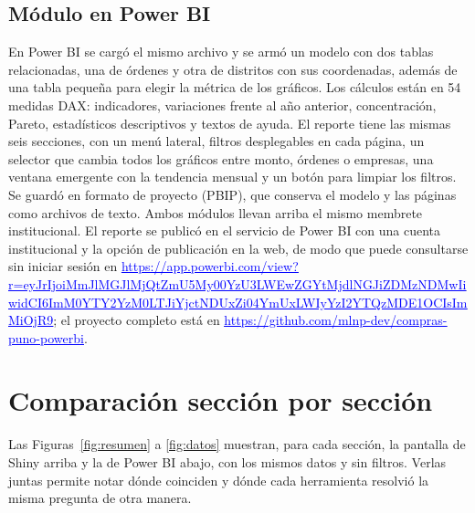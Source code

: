 \documentclass[12pt,a4paper]{article}
\newcommand{\enlace}[2]{\href{#1}{\textcolor{blue}{#2}}}
\begin{document}
\subsection{Módulo en Power BI}
En Power BI se cargó el mismo archivo y se armó un modelo con dos tablas relacionadas, una de órdenes y
otra de distritos con sus coordenadas, además de una tabla pequeña para elegir la métrica de los gráficos.
Los cálculos están en 54 medidas DAX: indicadores, variaciones frente al año anterior, concentración,
Pareto, estadísticos descriptivos y textos de ayuda. El reporte tiene las mismas seis secciones, con un
menú lateral, filtros desplegables en cada página, un selector que cambia todos los gráficos entre monto,
órdenes o empresas, una ventana emergente con la tendencia mensual y un botón para limpiar los filtros. Se
guardó en formato de proyecto (PBIP), que conserva el modelo y las páginas como archivos de texto. Ambos
módulos llevan arriba el mismo membrete institucional. El reporte se publicó en el servicio de Power BI
con una cuenta institucional y la opción de publicación en la web, de modo que puede consultarse sin
iniciar sesión en
\enlace{https://app.powerbi.com/view?r=eyJrIjoiMmJlMGJlMjQtZmU5My00YzU3LWEwZGYtMjdlNGJiZDMzNDMwIiwidCI6ImM0YTY2YzM0LTJiYjctNDUxZi04YmUxLWIyYzI2YTQzMDE1OCIsImMiOjR9}{\uline{https:/}\allowbreak \uline{/}\allowbreak \uline{app.}\allowbreak \uline{powerbi.}\allowbreak \uline{com/}\allowbreak \uline{view?r=eyJrIjoiM}\allowbreak \uline{mJlMGJlMjQtZmU5M}\allowbreak \uline{y00YzU3LWEwZGYtM}\allowbreak \uline{jdlNGJiZDMzNDMwI}\allowbreak \uline{iwidCI6ImM0YTY2Y}\allowbreak \uline{zM0LTJiYjctNDUxZ}\allowbreak \uline{i04YmUxLWIyYzI2Y}\allowbreak \uline{TQzMDE1OCIsImMiO}\allowbreak \uline{jR9}};
el proyecto completo está en \enlace{https://github.com/mlnp-dev/compras-puno-powerbi}{\uline{https:/}\allowbreak \uline{/}\allowbreak \uline{github.}\allowbreak \uline{com/}\allowbreak \uline{mlnp-}\allowbreak \uline{dev/}\allowbreak \uline{compras-}\allowbreak \uline{puno-}\allowbreak \uline{powerbi}}.

\section{Comparación sección por sección}
Las Figuras~\ref{fig:resumen} a \ref{fig:datos} muestran, para cada sección, la pantalla de Shiny arriba y
la de Power BI abajo, con los mismos datos y sin filtros. Verlas juntas permite notar dónde coinciden y
dónde cada herramienta resolvió la misma pregunta de otra manera.
\end{document}
